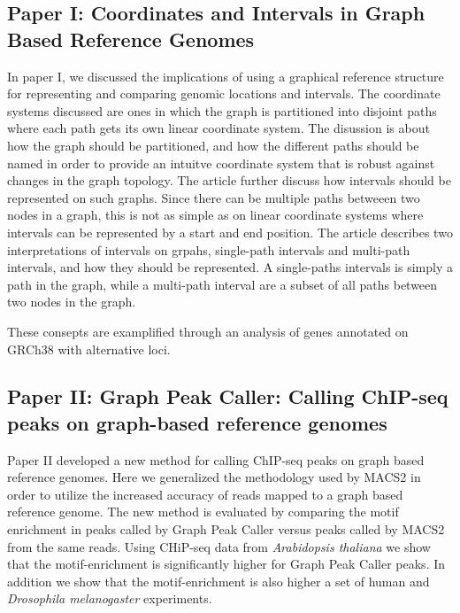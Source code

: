 \subsection*{Paper I: Coordinates and Intervals in Graph Based Reference Genomes}
In paper I, we discussed the implications of using a graphical reference structure for representing and comparing genomic locations and intervals.
The coordinate systems discussed are ones in which the graph is partitioned into disjoint paths where each path gets its own linear coordinate system.
The disussion is about how the graph should be partitioned, and how the different paths should be named in order to provide an intuitve coordinate system that is robust against changes in the graph topology. 
The article further discuss how intervals should be represented on such graphs.
Since there can be multiple paths betweeen two nodes in a graph, this is not as simple as on linear coordinate systems where intervals can be represented by a start and end position.
The article describes two interpretations of intervals on grpahs, single-path intervals and multi-path intervals, and how they should be represented.
A single-paths intervals is simply a path in the graph, while a multi-path interval are a subset of all paths between two nodes in the graph. 

These consepts are examplified through an analysis of genes annotated on GRCh38 with alternative loci.
\subsection*{Paper II: Graph Peak Caller: Calling ChIP-seq peaks on graph-based reference genomes}
Paper II developed a new method for calling ChIP-seq peaks on graph based reference genomes.
Here we generalized the methodology used by MACS2 in order to utilize the increased accuracy of reads mapped to a graph based reference genome.
The new method is evaluated by comparing the motif enrichment in peaks called by Graph Peak Caller versus peaks called by MACS2 from the same reads.
Using CHiP-seq data from \emph{Arabidopsis thaliana} we show that the motif-enrichment is significantly higher for Graph Peak Caller peaks.
In addition we show that the motif-enrichment is also higher a set of human and \emph{Drosophila melanogaster} experiments.

